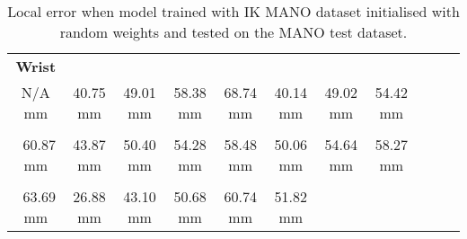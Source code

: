     \begin{table}[!ht]
    \begin{tabular}{|c|c|c|c|c|c|c|c|c|c|c|}
    \hline
    {\bfseries Wrist} & \cellcolor[HTML]{ffff00}{\bfseries IMCP} & \cellcolor[HTML]{ffff00}{\bfseries IPIP} & \cellcolor[HTML]{ffbf00}{\bfseries IDIP} & \cellcolor[HTML]{ff8000}{\bfseries ITIP} & \cellcolor[HTML]{ffff00}{\bfseries MMCP} & \cellcolor[HTML]{ffff00}{\bfseries MPIP} & \cellcolor[HTML]{ffbf00}{\bfseries MDIP}  \\
    N/A mm & \cellcolor[HTML]{ffff00}$\,\,\,$40.75 mm & \cellcolor[HTML]{ffff00}$\,\,\,$49.01 mm & \cellcolor[HTML]{ffbf00}$\,\,\,$58.38 mm & \cellcolor[HTML]{ff8000}$\,\,\,$68.74 mm & \cellcolor[HTML]{ffff00}$\,\,\,$40.14 mm & \cellcolor[HTML]{ffff00}$\,\,\,$49.02 mm & \cellcolor[HTML]{ffbf00}$\,\,\,$54.42 mm\\
    \hline
    \cellcolor[HTML]{ff8000}{\bfseries MTIP} & \cellcolor[HTML]{ffff00}{\bfseries RMCP} & \cellcolor[HTML]{ffbf00}{\bfseries RPIP} & \cellcolor[HTML]{ffbf00}{\bfseries RDIP} & \cellcolor[HTML]{ffbf00}{\bfseries RTIP} & \cellcolor[HTML]{ffbf00}{\bfseries PMCP} & \cellcolor[HTML]{ffbf00}{\bfseries PPIP} & \cellcolor[HTML]{ffbf00}{\bfseries PDIP}  \\
    \cellcolor[HTML]{ff8000}$\,\,\,$60.87 mm & \cellcolor[HTML]{ffff00}$\,\,\,$43.87 mm & \cellcolor[HTML]{ffbf00}$\,\,\,$50.40 mm & \cellcolor[HTML]{ffbf00}$\,\,\,$54.28 mm & \cellcolor[HTML]{ffbf00}$\,\,\,$58.48 mm & \cellcolor[HTML]{ffbf00}$\,\,\,$50.06 mm & \cellcolor[HTML]{ffbf00}$\,\,\,$54.64 mm & \cellcolor[HTML]{ffbf00}$\,\,\,$58.27 mm\\
    \hline
    \cellcolor[HTML]{ff8000}{\bfseries PTIP} & \cellcolor[HTML]{80ff00}{\bfseries TMCP} & \cellcolor[HTML]{ffff00}{\bfseries TPIP} & \cellcolor[HTML]{ffbf00}{\bfseries PDIP} & \cellcolor[HTML]{ff8000}{\bfseries TTIP} & \cellcolor[HTML]{ffbf00}{\bfseries Average}  \\
    \cellcolor[HTML]{ff8000}$\,\,\,$63.69 mm & \cellcolor[HTML]{80ff00}$\,\,\,$26.88 mm & \cellcolor[HTML]{ffff00}$\,\,\,$43.10 mm & \cellcolor[HTML]{ffbf00}$\,\,\,$50.68 mm & \cellcolor[HTML]{ff8000}$\,\,\,$60.74 mm & \cellcolor[HTML]{ffbf00}$\,\,\,$51.82 mm \\
    \cline{1-6}
    \end{tabular}
    \caption{Local error when model trained with IK MANO dataset initialised with random weights and tested on the MANO test dataset.}
    \label{}
    \end{table}